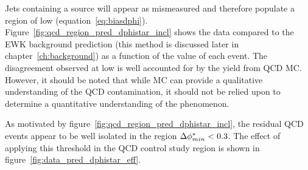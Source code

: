 Jets containing a \met source will appear as mismeasured and therefore
populate a region of low \dphistar (equation~\ref{eq:biasdphi}).
Figure~\ref{fig:qcd_region_pred_dphistar_incl} shows the data compared to the
EWK background prediction (this method is discussed later in
chapter~\ref{ch:background})
as a function of the \mindphistar value of each event. The disagreement observed
at low \mindphistar is well accounted for by the yield from QCD MC. However, it
should be noted that while MC can provide a qualitative understanding of the QCD
contamination, it should not be relied upon to determine a quantitative
understanding of the phenomenon.

As motivated by figure~\ref{fig:qcd_region_pred_dphistar_incl}, the residual QCD
events appear to be well isolated in the region $\Delta \phi^*_{min} < 0.3$. The effect
of applying this threshold in the QCD control study region is shown in
figure~\ref{fig:data_pred_dphistar_eff}.
% 

